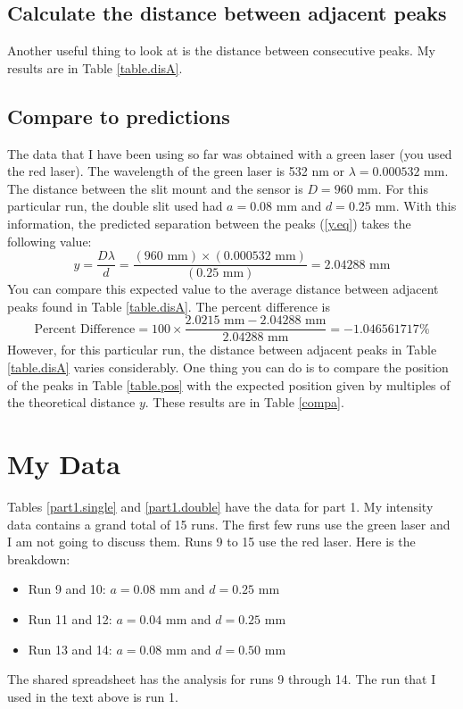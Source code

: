 \subsection{Calculate the distance between adjacent peaks}
Another useful thing to look at is the distance between consecutive peaks. My results are in Table \ref{table.disA}.
\subsection{Compare to  predictions}
The data that I have been using so far was obtained with a green laser (you used the red laser). The wavelength of the green laser is 532 nm or $\lambda = 0.000532$ mm. The distance between the slit mount and the sensor is $D = 960$ mm. For this particular run, the double slit used had $a = 0.08$ mm and $d = 0.25$ mm. With this information, the predicted separation between the peaks (\ref{y.eq}) takes the following value:
\begin{equation}
	y = \frac{D \lambda}{d} = \frac{(960 \text{ mm}) \times (0.000532 \text{ mm})}{(0.25 \text{ mm})} = 2.04288 \text{ mm}
\end{equation}
You can compare this expected value to the average distance between adjacent peaks found in Table \ref{table.disA}. The percent difference is
\begin{equation}
	\text{Percent Difference} = 100 \times \frac{2.0215 \text{ mm} - 2.04288 \text{ mm}}{2.04288 \text{ mm}} = -1.046561717 \%
\end{equation}
However, for this particular run, the distance between adjacent peaks in Table \ref{table.disA} varies considerably. One thing you can do is to compare the position of the peaks in Table \ref{table.pos} with the expected position given by multiples of the theoretical distance $y$. These results are in Table \ref{compa}.
\section{My Data}
Tables \ref{part1.single} and \ref{part1.double} have the data for part 1. My intensity data contains a grand total of 15 runs. The first few runs use the green laser and I am not going to discuss them. Runs 9 to 15 use the red laser. Here is the breakdown:
\begin{itemize}
	\item Run 9 and 10: $a = 0.08$ mm and $d = 0.25$ mm
	\item Run 11 and 12: $a = 0.04$ mm and $d = 0.25$ mm
	\item Run 13 and 14: $a = 0.08$ mm and $d = 0.50$ mm
\end{itemize}
The shared spreadsheet has the analysis for runs 9 through 14. The run that I used in the text above is run 1.
